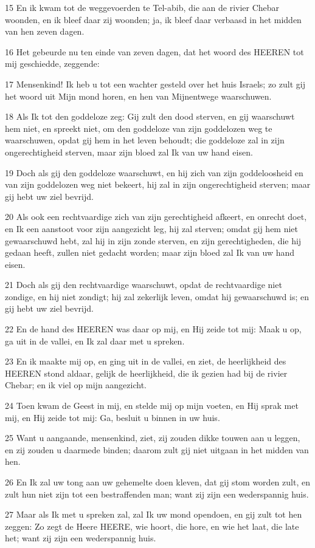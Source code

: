 \par 15 En ik kwam tot de weggevoerden te Tel-abib, die aan de rivier Chebar woonden, en ik bleef daar zij woonden; ja, ik bleef daar verbaasd in het midden van hen zeven dagen.
\par 16 Het gebeurde nu ten einde van zeven dagen, dat het woord des HEEREN tot mij geschiedde, zeggende:
\par 17 Mensenkind! Ik heb u tot een wachter gesteld over het huis Israels; zo zult gij het woord uit Mijn mond horen, en hen van Mijnentwege waarschuwen.
\par 18 Als Ik tot den goddeloze zeg: Gij zult den dood sterven, en gij waarschuwt hem niet, en spreekt niet, om den goddeloze van zijn goddelozen weg te waarschuwen, opdat gij hem in het leven behoudt; die goddeloze zal in zijn ongerechtigheid sterven, maar zijn bloed zal Ik van uw hand eisen.
\par 19 Doch als gij den goddeloze waarschuwt, en hij zich van zijn goddeloosheid en van zijn goddelozen weg niet bekeert, hij zal in zijn ongerechtigheid sterven; maar gij hebt uw ziel bevrijd.
\par 20 Als ook een rechtvaardige zich van zijn gerechtigheid afkeert, en onrecht doet, en Ik een aanstoot voor zijn aangezicht leg, hij zal sterven; omdat gij hem niet gewaarschuwd hebt, zal hij in zijn zonde sterven, en zijn gerechtigheden, die hij gedaan heeft, zullen niet gedacht worden; maar zijn bloed zal Ik van uw hand eisen.
\par 21 Doch als gij den rechtvaardige waarschuwt, opdat de rechtvaardige niet zondige, en hij niet zondigt; hij zal zekerlijk leven, omdat hij gewaarschuwd is; en gij hebt uw ziel bevrijd.
\par 22 En de hand des HEEREN was daar op mij, en Hij zeide tot mij: Maak u op, ga uit in de vallei, en Ik zal daar met u spreken.
\par 23 En ik maakte mij op, en ging uit in de vallei, en ziet, de heerlijkheid des HEEREN stond aldaar, gelijk de heerlijkheid, die ik gezien had bij de rivier Chebar; en ik viel op mijn aangezicht.
\par 24 Toen kwam de Geest in mij, en stelde mij op mijn voeten, en Hij sprak met mij, en Hij zeide tot mij: Ga, besluit u binnen in uw huis.
\par 25 Want u aangaande, mensenkind, ziet, zij zouden dikke touwen aan u leggen, en zij zouden u daarmede binden; daarom zult gij niet uitgaan in het midden van hen.
\par 26 En Ik zal uw tong aan uw gehemelte doen kleven, dat gij stom worden zult, en zult hun niet zijn tot een bestraffenden man; want zij zijn een wederspannig huis.
\par 27 Maar als Ik met u spreken zal, zal Ik uw mond opendoen, en gij zult tot hen zeggen: Zo zegt de Heere HEERE, wie hoort, die hore, en wie het laat, die late het; want zij zijn een wederspannig huis.

